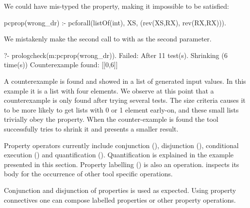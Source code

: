 We could have %
mis-typed the property, %
making
it impossible to be satisfied:
%
\begin{yapcode}
 pcprop(wrong_dr) :-
   pcforall(listOf(int), XS, (rev(XS,RX), rev(RX,RX))).
\end{yapcode}
%
We mistakenly make the second call to  with  as
the second parameter.
%
\begin{yapcode}
   ?- prologcheck(m:pcprop(wrong_dr)).
 Failed: After 11 test(s).
 Shrinking (6 time(s))
 Counterexample found: [[0,6]] 
\end{yapcode}
A counterexample is found and showed in a list of generated input
values.
%
In this example it is %
a list with four elements.%
%
We observe at this point that a counterexample is only found
after trying several tests.
%
The size criteria causes it to be more likely to get lists with 0 or 1
element early-on, and these small lists trivially obey the property.
%
When the counter-example is found the tool successfully tries to shrink
it and presents a smaller result.


Property operators currently  include conjunction
 (), disjunction (), conditional
execution () and quantification
().
%
%
Quantification is explained in the example presented in this section.
%
Property labelling () is also %
an operation.
%
%
\plqc{} inspects its body for the occurrence of other tool specific
operations.


Conjunction and disjunction of properties is used %
as expected.
%
%
Using property connectives one can compose labelled properties or %
other \plqc{} property operations.
%


